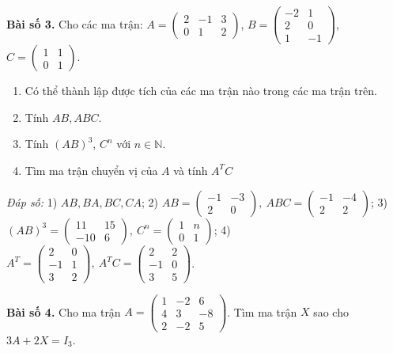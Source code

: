 \textbf{Bài số 3.} Cho các ma trận: \( A = \begin{pmatrix}
2 & -1 & 3 \\
0 & 1 & 2
\end{pmatrix} \), \( B = \begin{pmatrix}
-2 & 1 \\
2 & 0 \\
1 & -1
\end{pmatrix} \), \( C = \begin{pmatrix}
1 & 1 \\
0 & 1
\end{pmatrix} \).
\begin{enumerate}
    \item Có thể thành lập được tích của các ma trận nào trong các ma trận trên.
    \item Tính \( AB, ABC \).
    \item Tính \((AB)^3\), \(C^n\) với \(n \in \mathbb{N}\).

    \item Tìm ma trận chuyển vị của \(A\) và tính \(A^T C\)
    
\end{enumerate}

\textit{Đáp số:}
1) \(AB, BA, BC, CA\);
2) \(AB = \begin{pmatrix}
-1 & -3 \\
2 & 0
\end{pmatrix}, \ ABC = \begin{pmatrix}
-1 & -4 \\
2 & 2
\end{pmatrix}\);
3) \((AB)^3 = \begin{pmatrix}
11 & 15 \\
-10 & 6
\end{pmatrix}, \ C^n = \begin{pmatrix}
1 & n \\
0 & 1
\end{pmatrix}\);
4) \(A^T = \begin{pmatrix}
2 & 0 \\
-1 & 1 \\
3 & 2
\end{pmatrix}, \ A^T C = \begin{pmatrix}
2 & 2 \\
-1 & 0 \\
3 & 5
\end{pmatrix}\).

\textbf{Bài số 4.} Cho ma trận \(A = \begin{pmatrix}
1 & -2 & 6 \\
4 & 3 & -8 \\
2 & -2 & 5
\end{pmatrix}\). Tìm ma trận \(X\) sao cho \(3A + 2X = I_3\).

